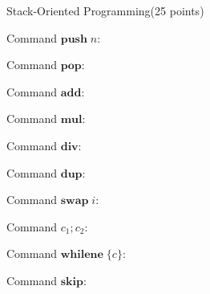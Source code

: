 \documentclass{article}
\begin{document}
\newpage
\begin{question}{Stack-Oriented Programming}{(25 points)}

\newcommand{\push}[1]{\ensuremath{\mathbf{push}\;#1}}
\newcommand{\add}{\ensuremath{\mathbf{add}}}
\newcommand{\mul}{\ensuremath{\mathbf{mul}}}
\newcommand{\divcom}{\ensuremath{\mathbf{div}}}
\newcommand{\pop}{\ensuremath{\mathbf{pop}}}
\newcommand{\dup}{\ensuremath{\mathbf{dup}}}
\newcommand{\swap}[1]{\ensuremath{\mathbf{swap}\;{#1}}}
\newcommand{\seq}[2]{\ensuremath{#1; #2}}
\renewcommand{\skip}{\ensuremath{\mathbf{skip}}}
\newcommand{\WHILENE}{\ensuremath{\mathbf{whilene}}\xspace}
\newcommand{\whilene}[1]{\ensuremath{\WHILENE\;\{#1\}}}
\newcommand{\emptystack}{\ensuremath{[]}}
\newcommand{\stack}{\ensuremath{S}}
\newcommand{\cons}[2]{\ensuremath{#1 :: #2}}




  \begin{subquestion}
    \begin{subsubquestion}
      Command $\push{n}$: 
    \end{subsubquestion}
    \begin{subsubquestion}
      Command $\pop$: 
    \end{subsubquestion}
    \begin{subsubquestion}
      Command $\add$: 
    \end{subsubquestion}
    \begin{subsubquestion}
      Command $\mul$: 
    \end{subsubquestion}
    \begin{subsubquestion}
      Command $\divcom$: 
    \end{subsubquestion}
    \begin{subsubquestion}
      Command $\dup$: 
    \end{subsubquestion}
    \begin{subsubquestion}
      Command $\swap{i}$: 
    \end{subsubquestion}
    \begin{subsubquestion}
      Command $\seq{c_1}{c_2}$: 
    \end{subsubquestion}
    \begin{subsubquestion}
      Command $\whilene{c}$: 
    \end{subsubquestion}
    \begin{subsubquestion}
      Command $\skip$: 
    \end{subsubquestion}


\end{subquestion}
\end{question}
\end{document}

